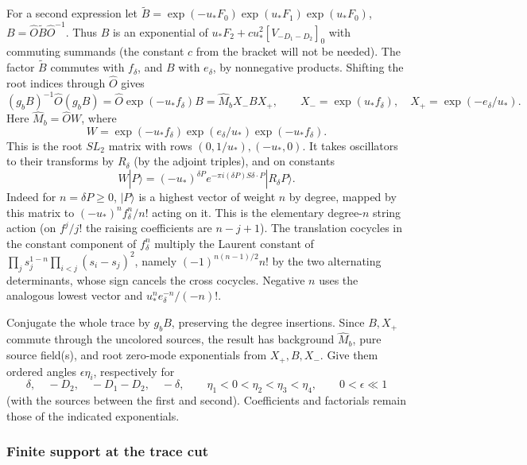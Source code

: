 For a second expression let \(\widetilde B=\exp(-u_*F_0)\exp(u_*F_1)\exp(u_*F_0)\), \(B=\widehat O\widetilde B\widehat O^{-1}\). Thus \(B\) is an exponential of \(u_* F_2+c u_*^2[V_{-D_1-D_2}]_0\) with commuting summands (the constant \(c\) from the bracket will not be needed). The factor \(\widetilde B\) commutes with \(f_\delta\), and \(B\) with \(e_\delta\), by nonnegative products. Shifting the root indices through \(\widehat O\) gives
\[
 (g_b B)^{-1}\widehat O(g_b B)=\widehat O\exp(-u_* f_\delta)B
   =\widehat M_b X_- B X_+,\qquad X_-=\exp(u_* f_\delta),\quad X_+=\exp(-e_\delta/u_*).
\]
Here \(\widehat M_b=\widehat O W\), where
\[W=\exp(-u_* f_\delta)\exp(e_\delta/u_*)\exp(-u_* f_\delta).\]
This is the root \(SL_2\) matrix with rows \((0,1/u_*),(-u_*,0)\). It takes oscillators to their transforms by \(R_\delta\) (by the adjoint triples), and on constants
\[
 W|P\rangle=(-u_*)^{\delta P}e^{-\pi i(\delta P)S\delta\cdot P}|R_\delta P\rangle .
\]
Indeed for \(n=\delta P\ge0\), \(|P\rangle\) is a highest vector of weight \(n\) by degree, mapped by this matrix to \((-u_*)^n f_\delta^n/n!\) acting on it. This is the elementary degree-\(n\) string action (on \(f^j/j!\) the raising coefficients are \(n-j+1\)). The translation cocycles in the constant component of \(f_\delta^n\) multiply the Laurent constant of \(\prod_j s_j^{1-n}\prod_{i<j}(s_i-s_j)^2\), namely \((-1)^{n(n-1)/2} n!\) by the two alternating determinants, whose sign cancels the cross cocycles. Negative \(n\) uses the analogous lowest vector and \(u_*^n e_\delta^{-n}/(-n)!\).

Conjugate the whole trace by \(g_b B\), preserving the degree insertions. Since \(B,X_+\) commute through the uncolored sources, the result has background \(\widehat M_b\), pure source field(s), and root zero-mode exponentials from \(X_+,B,X_-\). Give them ordered angles \(\epsilon\eta_i\), respectively for
\[
 \delta,\quad -D_2,\quad -D_1-D_2,\quad -\delta,\qquad
 \eta_1<0<\eta_2<\eta_3<\eta_4,\qquad 0<\epsilon\ll1
\]
(with the sources between the first and second). Coefficients and factorials remain those of the indicated exponentials.

\subsubsection*{Finite support at the trace cut}

